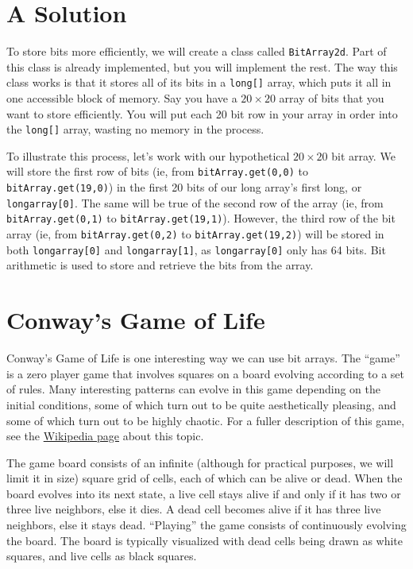 \documentclass[a4paper]{article}
\newcommand{\inlinecode}{\texttt}
\begin{document}
\section{A Solution}
To store bits more efficiently, we will create a class called \inlinecode{BitArray2d}. Part of this class is already implemented, but you will implement the rest. The way this class works is that it stores all of its bits in a \inlinecode{long[]} array, which puts it all in one accessible block of memory. Say you have a $20\times 20$ array of bits that you want to store efficiently. You will put each 20 bit row in your array in order into the \inlinecode{long[]} array, wasting no memory in the process.

To illustrate this process, let's work with our hypothetical $20\times 20$ bit array. We will store the first row of bits (ie, from \inlinecode{bitArray.get(0,0)} to \inlinecode{bitArray.get(19,0)}) in the first 20 bits of our long array's first long, or \inlinecode{longarray[0]}. The same will be true of the second row of the array (ie, from \inlinecode{bitArray.get(0,1)} to \inlinecode{bitArray.get(19,1)}). However, the third row of the bit array (ie, from \inlinecode{bitArray.get(0,2)} to \inlinecode{bitArray.get(19,2)}) will be stored in both \inlinecode{longarray[0]} and \inlinecode{longarray[1]}, as \inlinecode{longarray[0]} only has 64 bits. Bit arithmetic is used to store and retrieve the bits from the array.
\section{Conway's Game of Life}
Conway's Game of Life is one interesting way we can use bit arrays. The ``game'' is a zero player game that involves squares on a board evolving according to a set of rules. Many interesting patterns can evolve in this game depending on the initial conditions, some of which turn out to be quite aesthetically pleasing, and some of which turn out to be highly chaotic. For a fuller description of this game, see the \href{https://en.wikipedia.org/wiki/Conway\%27s_Game_of_Life}{Wikipedia page} about this topic.

The game board consists of an infinite (although for practical purposes, we will limit it in size) square grid of cells, each of which can be alive or dead. When the board evolves into its next state, a live cell stays alive if and only if it has two or three live neighbors, else it dies. A dead cell becomes alive if it has three live neighbors, else it stays dead. ``Playing'' the game consists of continuously evolving the board. The board is typically visualized with dead cells being drawn as white squares, and live cells as black squares.
\end{document}

